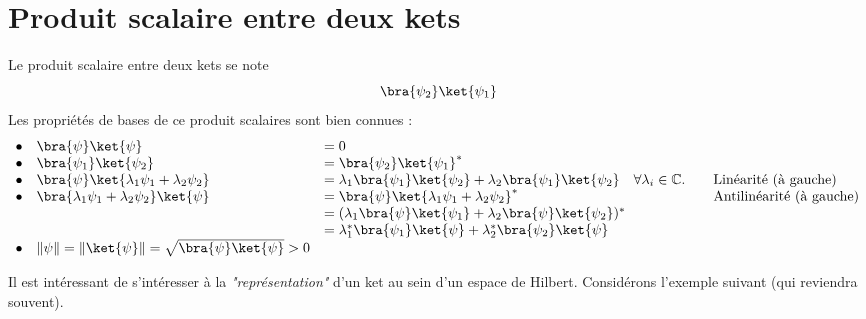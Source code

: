 \section{Produit scalaire entre deux kets}
Le produit scalaire entre deux kets se note
\begin{equation}
\bra{\psi_2}\ket{\psi_1}
\end{equation}
\newpage
Les propriétés de bases de ce produit scalaires sont bien connues :
\begin{equation}
\begin{array}{llll}
\bullet & \bra{\psi}\ket{\psi} &= 0\\
\bullet & \bra{\psi_1}\ket{\psi_2} &= \bra{\psi_2}\ket{\psi_1}^*\\
\bullet & \bra{\psi}\ket{\lambda_1\psi_1+\lambda_2\psi_2} &= \lambda_1\bra{\psi_1}\ket{\psi_2}
+\lambda_2\bra{\psi_1}\ket{\psi_2}\quad \forall \lambda_i\in\mathbb{C}.\quad
& \text{Linéarité (à gauche)}\\
\bullet & \bra{\lambda_1\psi_1+\lambda_2\psi_2}\ket{\psi} &= \bra{\psi}\ket{\lambda_1
\psi_1+\lambda_2\psi_2}^* \quad & \text{Antilinéarité (à gauche)}\\
&  &= (\lambda_1\bra{\psi}\ket{\psi_1}+\lambda_2\bra{\psi}\ket{\psi_2})^*\\
&  &= \lambda_1^*\bra{\psi_1}\ket{\psi} +  \lambda_2^*\bra{\psi_2}\ket{\psi}\\
\bullet & \|\psi\| = \|\ket{\psi}\| = \sqrt{\bra{\psi}\ket{\psi}}>0
\end{array}
\end{equation}

Il est intéressant de s'intéresser à la \textit{"représentation"} d'un ket au sein 
d'un espace de Hilbert. Considérons l’exemple suivant (qui reviendra souvent).\\

